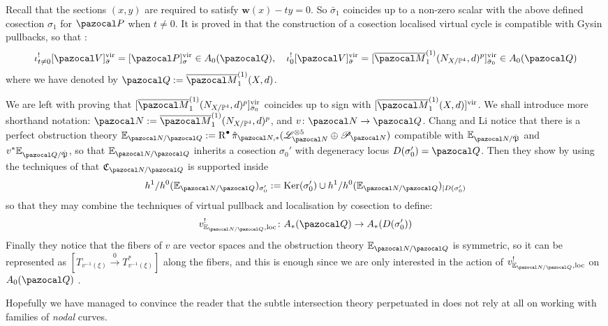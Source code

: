\documentclass[11pt]{amsart}
\newcommand{\Mone}[3]{\overline{\pazocal M}^{(1)}_{#1}(#2,#3)}
\newcommand{\PP}{\mathbb P}
\renewcommand{\to}{\rightarrow}
\newcommand{\hP}{\hat{\mathfrak P}}
\newcommand{\R}{\operatorname{R}}
\newcommand{\w}{\mathbf{w}}
\theoremstyle{plain}
\theoremstyle{definition}
\begin{document}
Recall that the sections $(x,y)$ are required to satisfy $\w(x)-ty=0$. So $\bar\sigma_1$ coincides up to a non-zero scalar with the above defined cosection $\sigma_1$ for $\pazocal P$ when $t\neq 0$. It is proved in \cite[Theorem 5.2]{KLcosection} that the construction of a cosection localised virtual cycle is compatible with Gysin pullbacks, so that \cite[Proposition 4.9]{CLpfields}:
\[
 \iota_{t\neq0}^![\pazocal V]^{\rm{vir}}_{\rm{\bar\sigma}}=[\pazocal P]^{\rm{vir}}_{\rm{\sigma}}\in A_0(\pazocal Q),\quad \iota_{0}^![\pazocal V]^{\rm{vir}}_{\rm{\bar\sigma}}=[\Mone{1}{N_{X/\PP^4}}{d}^p]^{\rm{vir}}_{\rm{\bar\sigma_0}}\in A_0(\pazocal Q)
\]
where we have denoted by $\pazocal Q:=\Mone{1}{X}{d}$.

We are left with proving that $[\Mone{1}{N_{X/\PP^4}}{d}^p]^{\rm{vir}}_{\rm{\bar\sigma_0}}$ coincides up to sign with $[\Mone{1}{X}{d}]^{\rm{vir}}$. We shall introduce more shorthand notation: $\pazocal N:=\Mone{1}{N_{X/\PP^4}}{d}^p$, and $v\colon\pazocal N\to\pazocal Q$. Chang and Li notice that there is a perfect obstruction theory $\mathbb E_{\pazocal N/\pazocal Q}:=\R^{\bullet}\hat\pi_{\pazocal N,*}(\mathcal L^{\otimes 5}_{\pazocal N}\oplus \mathcal P_{\pazocal N})$ compatible with $\mathbb E_{\pazocal N/\hP}$ and $v^*\mathbb E_{\pazocal Q/\hP}$, so that $\mathbb E_{\pazocal N/\pazocal Q}$ inherits a cosection $\sigma_0'$ with degeneracy locus $D(\sigma_0')=\pazocal Q$. Then \cite[Lemma 5.5]{CLpfields} they show by using the techniques of \cite{KKP} that $\mathfrak C_{\pazocal N/\pazocal Q}$ is supported inside 
\[
 h^1/h^0(\mathbb E_{\pazocal N/\pazocal Q})_{\sigma_0'}:=\operatorname{Ker}(\sigma_0')\cup  h^1/h^0(\mathbb E_{\pazocal N/\pazocal Q})_{|D(\sigma_0')}
\]
so that they may combine the techniques of virtual pullback \cite{Manolache-pullback} and localisation by cosection \cite{KLcosection} to define:
\[
 v^!_{\mathbb E_{\pazocal N/\pazocal Q},\rm{loc}}\colon A_*(\pazocal Q)\to A_*(D(\sigma_0'))
\]
Finally they notice that the fibers of $v$ are vector spaces and the obstruction theory $\mathbb E_{\pazocal N/\pazocal Q}$ is symmetric, so it can be represented as $[T_{v^{-1}(\xi)}\xrightarrow{0}T^*_{v^{-1}(\xi)}]$ along the fibers, and this is enough since we are only interested in the action of $v^!_{\mathbb E_{\pazocal N/\pazocal Q},\rm{loc}}$ on $A_0(\pazocal Q)$ \cite[Theorem 5.7]{CLpfields}.

Hopefully we have managed to convince the reader that the subtle intersection theory perpetuated in \cite{CLpfields} does not rely at all on working with families of \emph{nodal} curves.
\end{document}
